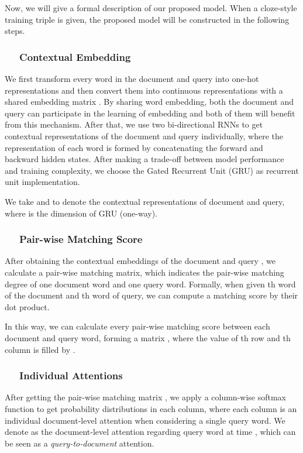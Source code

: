 \documentclass[11pt,a4paper]{article}
\begin{document}
Now, we will give a formal description of our proposed model.
When a cloze-style training triple  is given, the proposed model will be constructed in the following steps.

\subsubsection*{~~ Contextual Embedding}
We first transform every word in the document  and query  into one-hot representations and then convert them into continuous representations with a shared embedding matrix . 
By sharing word embedding, both the document and query can participate in the learning of embedding and both of them will benefit from this mechanism. 
After that, we use two bi-directional RNNs to get contextual representations of the document and query individually, where the representation of each word is formed by concatenating the forward and backward hidden states.
After making a trade-off between model performance and training complexity, we choose the Gated Recurrent Unit (GRU) \cite{cho-etal-2014} as recurrent unit implementation.


We take  and  to denote the contextual representations of document and query, where  is the dimension of GRU (one-way).


\subsubsection*{~~ Pair-wise Matching Score}
After obtaining the contextual embeddings of the document  and query , we calculate a pair-wise matching matrix, which indicates the pair-wise matching degree of one document word and one query word. Formally, when given th word of the document and th word of query, we can compute a matching score by their dot product.


In this way, we can calculate every pair-wise matching score between each document and query word, forming a matrix , where the value of th row and th column is filled by .

\subsubsection*{~~ Individual Attentions}
After getting the pair-wise matching matrix , we apply a column-wise softmax function to get probability distributions in each column, where each column is an individual document-level attention when considering a single query word. We denote  as the document-level attention regarding query word at time , which can be seen as a {\em query-to-document} attention. 
\newcommand\D{\displaystyle}
\end{document}
